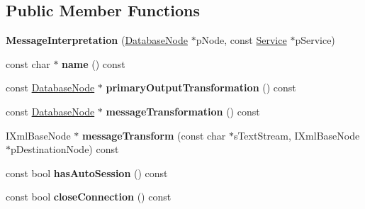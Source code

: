 \subsection*{\-Public \-Member \-Functions}
\begin{DoxyCompactItemize}
\item 
\hypertarget{classgeneral__server_1_1MessageInterpretation_a84fa73e2de0f7f4e9c84c2cced476562}{{\bfseries \-Message\-Interpretation} (\hyperlink{classgeneral__server_1_1DatabaseNode}{\-Database\-Node} $\ast$p\-Node, const \hyperlink{classgeneral__server_1_1Service}{\-Service} $\ast$p\-Service)}\label{classgeneral__server_1_1MessageInterpretation_a84fa73e2de0f7f4e9c84c2cced476562}

\item 
\hypertarget{classgeneral__server_1_1MessageInterpretation_a8e510006a2f0bb27202608ebdb5a8081}{const char $\ast$ {\bfseries name} () const }\label{classgeneral__server_1_1MessageInterpretation_a8e510006a2f0bb27202608ebdb5a8081}

\item 
\hypertarget{classgeneral__server_1_1MessageInterpretation_a8eff5596a996872386bc7caf687aabd4}{const \hyperlink{classgeneral__server_1_1DatabaseNode}{\-Database\-Node} $\ast$ {\bfseries primary\-Output\-Transformation} () const }\label{classgeneral__server_1_1MessageInterpretation_a8eff5596a996872386bc7caf687aabd4}

\item 
\hypertarget{classgeneral__server_1_1MessageInterpretation_af78660161480606389981814a3970b6a}{const \hyperlink{classgeneral__server_1_1DatabaseNode}{\-Database\-Node} $\ast$ {\bfseries message\-Transformation} () const }\label{classgeneral__server_1_1MessageInterpretation_af78660161480606389981814a3970b6a}

\item 
\hypertarget{classgeneral__server_1_1MessageInterpretation_a8b2fa5acd6e842632bffee6c5a9161d0}{\-I\-Xml\-Base\-Node $\ast$ {\bfseries message\-Transform} (const char $\ast$s\-Text\-Stream, \-I\-Xml\-Base\-Node $\ast$p\-Destination\-Node) const }\label{classgeneral__server_1_1MessageInterpretation_a8b2fa5acd6e842632bffee6c5a9161d0}

\item 
\hypertarget{classgeneral__server_1_1MessageInterpretation_aee4d30da2745414865238dc949445cf4}{const bool {\bfseries has\-Auto\-Session} () const }\label{classgeneral__server_1_1MessageInterpretation_aee4d30da2745414865238dc949445cf4}

\item 
\hypertarget{classgeneral__server_1_1MessageInterpretation_aaa025d0695a850cb1fbdcf4df9cdb87b}{const bool {\bfseries close\-Connection} () const }\label{classgeneral__server_1_1MessageInterpretation_aaa025d0695a850cb1fbdcf4df9cdb87b}


\end{DoxyCompactItemize}
